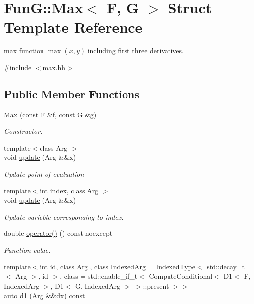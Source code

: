 \hypertarget{structFunG_1_1Max}{}\section{FunG\+:\+:Max$<$ F, G $>$ Struct Template Reference}
\label{structFunG_1_1Max}


max function $ \max(x,y) $ including first three derivatives.  




{\ttfamily \#include $<$max.\+hh$>$}

\subsection*{Public Member Functions}
\begin{DoxyCompactItemize}
\item 
\hyperlink{structFunG_1_1Max_a36634d1a8326fac047a1c7147e446f37}{Max} (const F \&f, const G \&g)
\begin{DoxyCompactList}\small\item\em Constructor. \end{DoxyCompactList}\item 
{\footnotesize template$<$class Arg $>$ }\\void \hyperlink{structFunG_1_1Max_a4544a007e03f04ec7bc6aef1f41bb09d}{update} (Arg \&\&x)
\begin{DoxyCompactList}\small\item\em Update point of evaluation. \end{DoxyCompactList}\item 
{\footnotesize template$<$int index, class Arg $>$ }\\void \hyperlink{structFunG_1_1Max_a6f3c89a9e33d2a9572a3e3a03c6b35af}{update} (Arg \&\&x)
\begin{DoxyCompactList}\small\item\em Update variable corresponding to index. \end{DoxyCompactList}\item 
double \hyperlink{structFunG_1_1Max_a61b78618f4af19680467ef7eef58f96b}{operator()} () const noexcept
\begin{DoxyCompactList}\small\item\em Function value. \end{DoxyCompactList}\item 
{\footnotesize template$<$int id, class Arg , class Indexed\+Arg  = Indexed\+Type$<$ std\+::decay\+\_\+t$<$ Arg $>$, id $>$, class  = std\+::enable\+\_\+if\+\_\+t$<$                       Compute\+Conditional$<$ D1$<$ F, Indexed\+Arg $>$, D1$<$ G, Indexed\+Arg $>$ $>$\+::present $>$$>$ }\\auto \hyperlink{structFunG_1_1Max_aba38a9cd783b08818779a18b6fef07dd}{d1} (Arg \&\&dx) const 

\end{DoxyCompactItemize}
